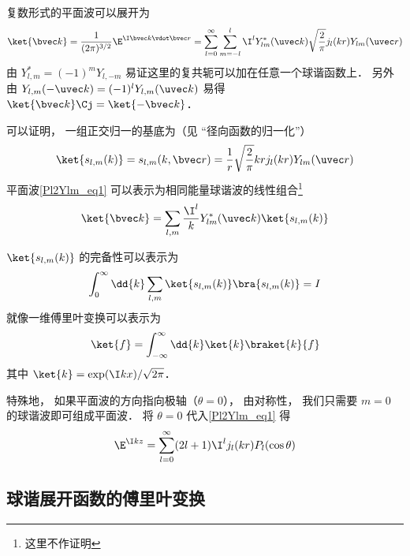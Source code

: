 
\begin{issues}
\issueAbstract
\end{issues}


复数形式的平面波可以展开为
\begin{equation}\label{Pl2Ylm_eq1}
\ket{\bvec k} = \frac{1}{(2\pi)^{3/2}}\E^{\I \bvec k \vdot \bvec r} = \sum_{l=0}^{\infty} \sum_{m=-l}^l \I^l Y_{lm}^*(\uvec k) \sqrt{\frac{2}{\pi}} j_l(kr) Y_{lm}(\uvec r)
\end{equation}
由 $Y_{l,m}^* = (-1)^m Y_{l,-m}$ 易证这里的复共轭可以加在任意一个球谐函数上． 另外由 $Y_{l,m}(-\uvec k) = (-1)^l Y_{l,m}(\uvec k)$ 易得 $\ket{\bvec k}\Cj = \ket{-\bvec k}$．

可以证明， 一组正交归一的基底为（见 “径向函数的归一化”）
\begin{equation}
\ket{s_{l,m}(k)} = s_{l,m}(k,\bvec r) = \frac{1}{r}\sqrt{\frac{2}{\pi}}kr j_l(kr) Y_{lm}(\uvec r)
\end{equation}
平面波\autoref{Pl2Ylm_eq1} 可以表示为相同能量球谐波的线性组合\footnote{这里不作证明}
\begin{equation}\label{Pl2Ylm_eq3}
\ket{\bvec k} = \sum_{l,m}\frac{\I^l}{k} Y_{lm}^*(\uvec k)\ket{s_{l,m}(k)} 
\end{equation}

$\ket{s_{l,m}(k)}$ 的完备性可以表示为
\begin{equation}
\int_0^\infty \dd{k} \sum_{l,m} \ket{s_{l,m}(k)}\bra{s_{l,m}(k)} = I
\end{equation}
就像一维傅里叶变换可以表示为%
\begin{equation}
\ket{f} = \int_{-\infty}^{\infty} \dd{k} \ket{k}\braket{k}{f}
\end{equation}
其中 $\ket{k} = \exp(\I kx)/\sqrt{2\pi}$．

特殊地， 如果平面波的方向指向极轴（$\theta = 0$）， 由对称性， 我们只需要 $m = 0$ 的球谐波即可组成平面波． 将 $\theta = 0$ 代入\autoref{Pl2Ylm_eq1} 得
\begin{equation}
\E^{\I kz} = \sum_{l=0}^\infty (2l+1) \I^l j_l(kr) P_l(\cos\theta)
\end{equation}

\subsection{球谐展开函数的傅里叶变换}

